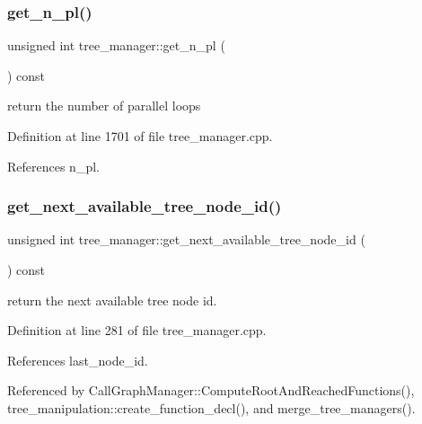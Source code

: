 \subsubsection{\texorpdfstring{get\+\_\+n\+\_\+pl()}{get\_n\_pl()}}
{\footnotesize\ttfamily unsigned int tree\+\_\+manager\+::get\+\_\+n\+\_\+pl (\begin{DoxyParamCaption}{ }\end{DoxyParamCaption}) const}



return the number of parallel loops 



Definition at line 1701 of file tree\+\_\+manager.\+cpp.



References n\+\_\+pl.

\mbox{\label{classtree__manager_a7adac56ed0eef2f391ac2a7ee691f04e}} 
\subsubsection{\texorpdfstring{get\+\_\+next\+\_\+available\+\_\+tree\+\_\+node\+\_\+id()}{get\_next\_available\_tree\_node\_id()}}
{\footnotesize\ttfamily unsigned int tree\+\_\+manager\+::get\+\_\+next\+\_\+available\+\_\+tree\+\_\+node\+\_\+id (\begin{DoxyParamCaption}{ }\end{DoxyParamCaption}) const}



return the next available tree node id. 



Definition at line 281 of file tree\+\_\+manager.\+cpp.



References last\+\_\+node\+\_\+id.



Referenced by Call\+Graph\+Manager\+::\+Compute\+Root\+And\+Reached\+Functions(), tree\+\_\+manipulation\+::create\+\_\+function\+\_\+decl(), and merge\+\_\+tree\+\_\+managers().

